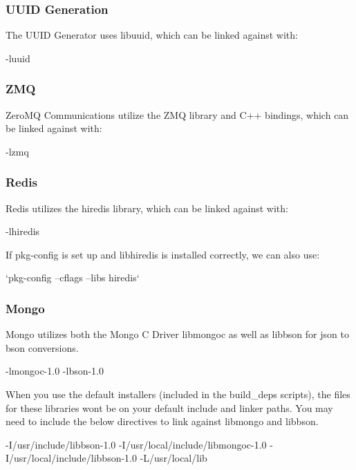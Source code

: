 \subsubsection*{U\+U\+ID Generation}

The U\+U\+ID Generator uses libuuid, which can be linked against with\+: \begin{DoxyVerb}-luuid
\end{DoxyVerb}


\subsubsection*{Z\+MQ}

Zero\+MQ Communications utilize the Z\+MQ library and C++ bindings, which can be linked against with\+: \begin{DoxyVerb}-lzmq
\end{DoxyVerb}


\subsubsection*{Redis}

Redis utilizes the hiredis library, which can be linked against with\+: \begin{DoxyVerb}-lhiredis
\end{DoxyVerb}


If pkg-\/config is set up and libhiredis is installed correctly, we can also use\+: \begin{DoxyVerb}`pkg-config --cflags --libs hiredis`
\end{DoxyVerb}


\subsubsection*{Mongo}

Mongo utilizes both the Mongo C Driver libmongoc as well as libbson for json to bson conversions. \begin{DoxyVerb}-lmongoc-1.0 -lbson-1.0
\end{DoxyVerb}


When you use the default installers (included in the build\+\_\+deps scripts), the files for these libraries won\textquotesingle{}t be on your default include and linker paths. You may need to include the below directives to link against libmongo and libbson. \begin{DoxyVerb}-I/usr/include/libbson-1.0 -I/usr/local/include/libmongoc-1.0 -I/usr/local/include/libbson-1.0 -L/usr/local/lib
\end{DoxyVerb}


